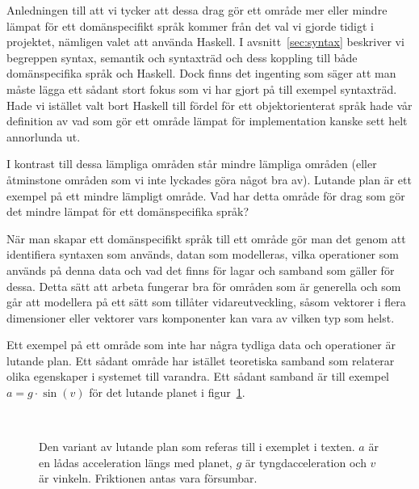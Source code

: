 Anledningen till att vi tycker att dessa drag gör ett område mer eller
mindre lämpat för ett domänspecifikt språk kommer från det val vi gjorde tidigt
i projektet, nämligen valet att använda Haskell. I avsnitt~\ref{sec:syntax}
beskriver vi begreppen syntax, semantik och syntaxträd och dess koppling till
både domänspecifika språk och Haskell. Dock finns det ingenting som säger att
man måste lägga ett sådant stort fokus som vi har gjort på till exempel syntaxträd. Hade
vi istället valt bort Haskell till fördel för ett objektorienterat språk hade vår definition av vad som gör ett område lämpat för
implementation kanske sett helt annorlunda ut.

I kontrast till dessa lämpliga områden står mindre lämpliga områden (eller
åtminstone områden som vi inte lyckades göra något bra av). Lutande plan är ett exempel på ett mindre lämpligt område. Vad har detta område för drag som gör det mindre
lämpat för ett domänspecifika språk?

När man skapar ett domänspecifikt språk till ett område gör man det genom att
identifiera syntaxen som används, datan som modelleras,
vilka operationer som används på denna data och vad det finns för lagar och samband
som gäller för dessa. Detta sätt att arbeta fungerar bra för områden som är
generella och som går att modellera på ett sätt som tillåter vidareutveckling, såsom
vektorer i flera dimensioner eller vektorer vars komponenter kan vara av vilken
typ som helst.

Ett exempel på ett område som inte har några tydliga data och operationer är 
lutande plan. Ett sådant område har istället teoretiska samband som relaterar
olika egenskaper i systemet till varandra. Ett sådant samband är till exempel $a
= g \cdot \sin(v)$ för det lutande planet i figur~\ref{fig:lutande_plan}.

\begin{figure}[tph]
  \centering
  \caption{Den variant av lutande plan som referas till i exemplet i texten. $a$
  är en lådas acceleration längs med planet, $g$ är tyngdacceleration och $v$ är
  vinkeln. Friktionen antas vara försumbar.}~\label{fig:lutande_plan}
\end{figure}

